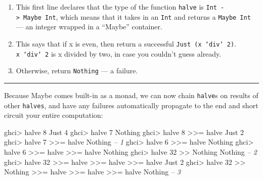 \documentclass[]{article}
\newenvironment{Shaded}{}{}
\newcommand{\DataTypeTok}[1]{\textcolor[rgb]{0.56,0.13,0.00}{{#1}}}
\newcommand{\DecValTok}[1]{\textcolor[rgb]{0.25,0.63,0.44}{{#1}}}
\newcommand{\CommentTok}[1]{\textcolor[rgb]{0.38,0.63,0.69}{\textit{{#1}}}}
\newcommand{\FunctionTok}[1]{\textcolor[rgb]{0.02,0.16,0.49}{{#1}}}
\newcommand{\NormalTok}[1]{{#1}}
\begin{document}
\begin{enumerate}
\def\labelenumi{\arabic{enumi}.}
\tightlist
\item
  This first line declares that the type of the function \texttt{halve}
  is \texttt{Int\ -\textgreater{}\ Maybe\ Int}, which means that it
  takes in an \texttt{Int} and returns a \texttt{Maybe\ Int} --- an
  integer wrapped in a ``Maybe'' container.
\item
  This says that if x is even, then return a successful
  \texttt{Just\ (x\ `div`\ 2)}. \texttt{x\ `div`\ 2} is x divided by
  two, in case you couldn't guess already.
\item
  Otherwise, return \texttt{Nothing} --- a failure.
\end{enumerate}

\begin{center}\rule{0.5\linewidth}{\linethickness}\end{center}

Because Maybe comes built-in as a monad, we can now chain
\texttt{halve}s on results of other \texttt{halves}, and have any
failures automatically propagate to the end and short circuit your
entire computation:

\begin{Shaded}
\begin{Highlighting}[]
\NormalTok{ghci}\FunctionTok{>} \NormalTok{halve }\DecValTok{8}
\DataTypeTok{Just} \DecValTok{4}
\NormalTok{ghci}\FunctionTok{>} \NormalTok{halve }\DecValTok{7}
\DataTypeTok{Nothing}
\NormalTok{ghci}\FunctionTok{>} \NormalTok{halve }\DecValTok{8} \FunctionTok{>>=} \NormalTok{halve}
\DataTypeTok{Just} \DecValTok{2}
\NormalTok{ghci}\FunctionTok{>} \NormalTok{halve }\DecValTok{7} \FunctionTok{>>=} \NormalTok{halve}
\DataTypeTok{Nothing}                         \CommentTok{-- 1}
\NormalTok{ghci}\FunctionTok{>} \NormalTok{halve }\DecValTok{6} \FunctionTok{>>=} \NormalTok{halve}
\DataTypeTok{Nothing}
\NormalTok{ghci}\FunctionTok{>} \NormalTok{halve }\DecValTok{6} \FunctionTok{>>=} \NormalTok{halve }\FunctionTok{>>=} \NormalTok{halve}
\DataTypeTok{Nothing}
\NormalTok{ghci}\FunctionTok{>} \NormalTok{halve }\DecValTok{32} \FunctionTok{>>} \DataTypeTok{Nothing}
\DataTypeTok{Nothing}                         \CommentTok{-- 2}
\NormalTok{ghci}\FunctionTok{>} \NormalTok{halve }\DecValTok{32} \FunctionTok{>>=} \NormalTok{halve }\FunctionTok{>>=} \NormalTok{halve }\FunctionTok{>>=} \NormalTok{halve}
\DataTypeTok{Just} \DecValTok{2}
\NormalTok{ghci}\FunctionTok{>} \NormalTok{halve }\DecValTok{32} \FunctionTok{>>} \DataTypeTok{Nothing} \FunctionTok{>>=} \NormalTok{halve }\FunctionTok{>>=} \NormalTok{halve }\FunctionTok{>>=} \NormalTok{halve}
\DataTypeTok{Nothing}                         \CommentTok{-- 3}
\end{Highlighting}
\end{Shaded}
\end{document}
